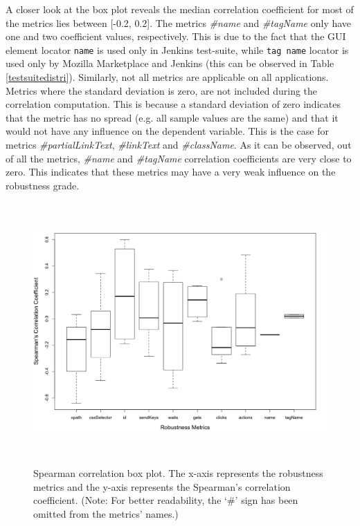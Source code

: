 A closer look at the box plot reveals the median correlation coefficient for most of the metrics lies between [-0.2, 0.2]. The metrics \textit{\#name} and \textit{\#tagName} only have one and two coefficient values, respectively. This is due to the fact that the GUI element locator \texttt{name} is used only in Jenkins test-suite, while \texttt{tag name} locator is used only by Mozilla Marketplace and Jenkins (this can be observed in Table \ref{testsuitedistri}). Similarly, not all metrics are applicable on all applications. Metrics where the standard deviation is zero, are not included during the correlation computation. This is because a standard deviation of zero indicates that the metric has no spread (e.g. all sample values are the same) and that it would not have any influence on the dependent variable. This is the case for metrics \textit{\#partialLinkText}, \textit{\#linkText} and \textit{\#className}. As it can be observed, out of all the metrics, \textit{\#name} and \textit{\#tagName} correlation coefficients are very close to zero. This indicates that these metrics may have a very weak influence on the robustness grade. 

\begin{figure}[ht!] 
\centering     %
\includegraphics[width=15cm,height=10cm]{./Figures/spearman-rq2}
 \captionsetup{justification=justified,
singlelinecheck=false}
\caption{Spearman correlation box plot. The x-axis represents the robustness metrics and the y-axis represents the Spearman's correlation coefficient. (Note: For better readability, the `\#' sign has been omitted from the metrics' names.)}
\label{fig:spearman}
\end{figure} 

